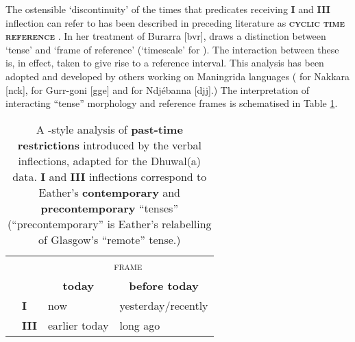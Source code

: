 The ostensible `discontinuity' of the times that predicates receiving \textbf{I} and \textbf{III} inflection can refer to has been described in preceding literature as \textbf{\textsc{cyclic time reference}} \citep[88]{Comrie1983}. In her treatment of Burarra [\gls{bvr}], \citet{Glasgow1964} draws a distinction between `tense' and `frame of reference' (`timescale' for \citealt[48]{Green1987}). The interaction between these is, in effect, taken to give rise to a reference interval. This analysis has been adopted and developed by others working on Maningrida languages (\citet[165]{Eather2011} for Nakkara [\gls{nck}], \citet{Green1995} for Gurr-goni [\gls{gge}] and \citet{McKay2000} for Ndjébanna [\gls{djj}].) The interpretation of interacting ``tense'' morphology and reference frames is schematised in Table \ref{GlaswegianTR}. 



\begin{table}[h]\centering\onehalfspacing
	\begin{tabular}{@{}llll@{}}\toprule
		
		&                 & \multicolumn{2}{c}{\textsc{frame}}          \\ 
		&                 & \multicolumn{1}{c}{\textbf{today}}         & \multicolumn{1}{c}{\textbf{before today}}      \\\midrule
		\multirow{2}{*}{\textsc{\rotatebox[origin=c]{90}{infl}}} & \textbf{\phantom{I}I}    & now           & yesterday/recently \\
		& \textbf{III} & earlier today & long ago           \\ \bottomrule%
	\end{tabular}
	\caption{A \citealt{Glasgow1964}-style analysis of \textbf{past-time restrictions} introduced by the verbal inflections, adapted for the Dhuwal(a) data. \textbf{I} and \textbf{III} inflections correspond to Eather's \textbf{contemporary} and \textbf{precontemporary} ``tenses'' (``precontemporary'' is Eather's \citeyearpar[166]{Eather2011} relabelling of Glasgow's ``remote'' tense.)}\label{GlaswegianTR}
\end{table}

